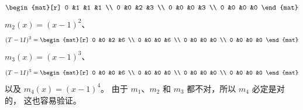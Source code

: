 \begin{exercises}
\begin{answer}
\begin{equation*}
        \begin{mat}[r]
          0  &1  &1  &1  \\
          0  &0  &2  &3  \\
          0  &0  &0  &3  \\
          0  &0  &0  &0
        \end{mat}
      \end{equation*}
      $m_2(x)=(x-1)^2$、 
      \begin{equation*}
        (T-1I)^2=
        \begin{mat}[r]
          0  &0  &2  &6  \\
          0  &0  &0  &6  \\
          0  &0  &0  &0  \\
          0  &0  &0  &0
        \end{mat}
      \end{equation*}
      $m_3(x)=(x-1)^3$、
      \begin{equation*}
        (T-1I)^3=
        \begin{mat}[r]
          0  &0  &0  &6  \\
          0  &0  &0  &0  \\
          0  &0  &0  &0  \\
          0  &0  &0  &0
        \end{mat}
      \end{equation*}
      以及 $m_4(x)=(x-1)^4$。
      由于 $m_1$、$m_2$ 和 $m_3$ 都不对，所以 $m_4$ 必定是对的，
      这也容易验证。
      

\end{answer}
\end{exercises}
